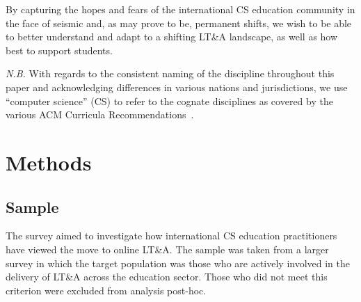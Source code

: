 \documentclass[conference]{IEEEtran}
\begin{document}
By capturing the hopes and fears of the international CS
education community in the face of seismic and, as may prove to be,
permanent shifts, we wish to be able to better understand and adapt to a
shifting LT\&A landscape, as well as how best to support students.



{\emph{N.B.}} With regards to the consistent naming of the discipline
throughout this paper and acknowledging differences in various nations
and jurisdictions, we use ``computer science'' (CS) to refer to the
cognate disciplines as covered by the various ACM Curricula
Recommendations~\cite{acmcurricula:2017}.

\section{Methods}\label{methods}

\subsection{Sample}


The survey aimed to investigate how international CS education
practitioners have viewed the move to online LT\&A. The sample was
taken from a larger survey in which the target population was those
who are actively involved in the delivery of LT\&A across the
education sector. Those who did not meet this criterion were excluded
from analysis post-hoc.
\end{document}
